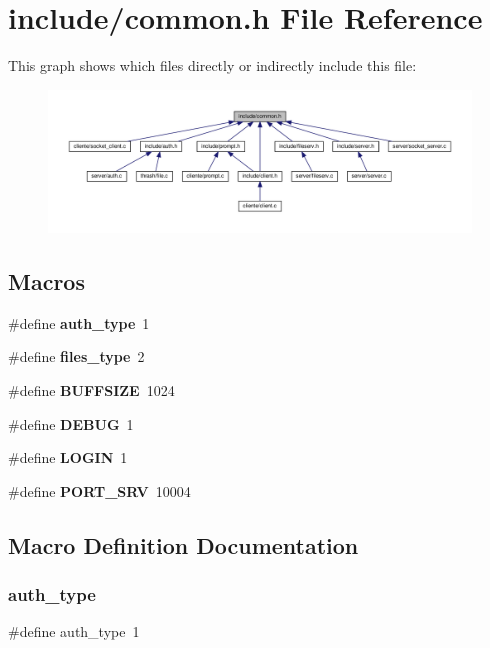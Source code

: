 \section{include/common.h File Reference}
\label{common_8h}
This graph shows which files directly or indirectly include this file\+:
\nopagebreak
\begin{figure}[H]
\begin{center}
\leavevmode
\includegraphics[width=350pt]{common_8h__dep__incl}
\end{center}
\end{figure}
\subsection*{Macros}
\begin{DoxyCompactItemize}
\item 
\#define \textbf{ auth\+\_\+type}~1
\item 
\#define \textbf{ files\+\_\+type}~2
\item 
\#define \textbf{ B\+U\+F\+F\+S\+I\+ZE}~1024
\item 
\#define \textbf{ D\+E\+B\+UG}~1
\item 
\#define \textbf{ L\+O\+G\+IN}~1
\item 
\#define \textbf{ P\+O\+R\+T\+\_\+\+S\+RV}~10004
\end{DoxyCompactItemize}


\subsection{Macro Definition Documentation}
\mbox{\label{common_8h_aeccf496f78c1193cbacd50d37bf8fa2d}} 
\subsubsection{auth\+\_\+type}
{\footnotesize\ttfamily \#define auth\+\_\+type~1}

